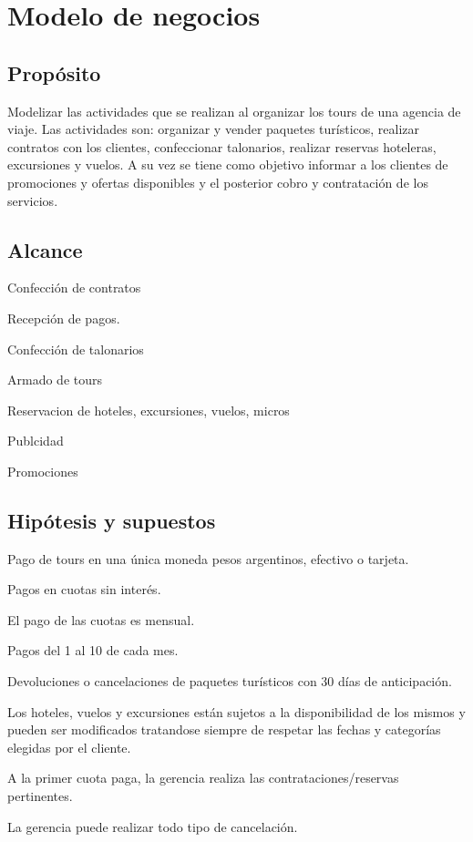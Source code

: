 \documentclass[12pt,a4paper,titlepage,oneside]{article}
\renewenvironment{itemize}{
 \begin{list}{}{
  \setlength{\leftmargin}{1.5em}
 }
}{
 \end{list}
}
\begin{document}
\section{Modelo de negocios}

\subsection{Propósito}
Modelizar las actividades que se realizan al organizar los tours de una agencia de viaje. 
Las actividades son: organizar y vender paquetes turísticos, realizar contratos con los clientes, confeccionar talonarios, realizar reservas hoteleras, excursiones  y vuelos. A su vez se tiene como objetivo informar a los clientes de promociones y ofertas disponibles y el posterior cobro y contratación de los servicios.


\subsection{Alcance}

\begin{itemize}
\item[•] Confección de contratos
\item[•] Recepción de pagos.
\item[•] Confección de talonarios
\item[•] Armado de tours
\item[•] Reservacion de hoteles, excursiones, vuelos, micros
\item[•] Publcidad
\item[•] Promociones
\end{itemize}



\subsection{Hipótesis y supuestos}

\begin{itemize}
\item[•] Pago de tours en una única moneda pesos argentinos, efectivo o tarjeta.
\item[•] Pagos en cuotas sin interés.
\item[•] El pago de las cuotas es mensual.
\item[•] Pagos del 1 al 10 de cada mes.
\item[•] Devoluciones o cancelaciones de paquetes turísticos con 30 días de anticipación.
\item[•] Los hoteles, vuelos y excursiones están sujetos a la disponibilidad de los mismos y pueden ser modificados  tratandose siempre de respetar las fechas y categorías elegidas por el cliente.
\item[•] A la primer cuota paga, la gerencia realiza las contrataciones/reservas pertinentes.
\item[•] La gerencia puede realizar todo tipo de cancelación.
\end{itemize}
\end{document}
